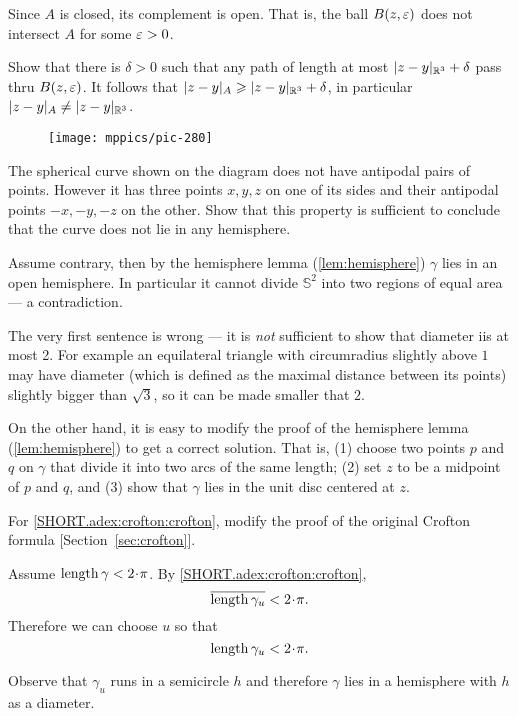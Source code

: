 Since $A$ is closed, its complement is open.
That is, the ball $B(z,\varepsilon)$ does not intersect $A$ for some $\varepsilon>0$.

Show that there is $\delta>0$ such that any path of length at most $|z-y|_{\mathbb{R}^3}+\delta$ pass thru $B(z,\varepsilon)$.
It follows that $|z-y|_A\geqslant |z-y|_{\mathbb{R}^3}+\delta$, 
in particular$|z-y|_A\ne |z-y|_{\mathbb{R}^3}$.

\begin{wrapfigure}{r}{30 mm}
\vskip-0mm
\centering
\texttt{[image: mppics/pic-280]}
\vskip0mm
\end{wrapfigure}

The spherical curve shown on the diagram does not have antipodal pairs of points.
However it has three points $x,y,z$ on one of its sides and their antipodal points $-x,-y,-z$ on the other.
Show that this property is sufficient to conclude that the curve does not lie in any hemisphere.

Assume contrary, then by the hemisphere lemma (\ref{lem:hemisphere}) $\gamma$ lies in an open hemisphere.
In particular it cannot divide $\mathbb{S}^2$ into two regions of equal area --- a contradiction.

The very first sentence is wrong --- it is {}\emph{not} sufficient to show that diameter iis at most 2.
For example an equilateral triangle with circumradius slightly above $1$ may have diameter (which is defined as the maximal distance between its points) slightly bigger than $\sqrt3$, so it can be made smaller that $2$.

On the other hand, it is easy to modify the proof of the hemisphere lemma (\ref{lem:hemisphere}) to get a correct solution.
That is, (1) choose two points $p$ and $q$ on $\gamma$ that divide it into two arcs of the same length;
(2) set $z$ to be a midpoint of $p$ and $q$,
and (3) show that $\gamma$ lies in the unit disc centered at $z$.


For \ref{SHORT.adex:crofton:crofton}, modify the proof of the original Crofton formula
[Section~\ref{sec:crofton}].

Assume $\length \gamma<2\cdot\pi$.
By \ref{SHORT.adex:crofton:crofton},
\[\overline{\length \gamma_u}<2\cdot\pi.\]
Therefore we can choose $u$ so that 
\[\length \gamma_u<2\cdot\pi.\]

Observe that $\gamma_u$ runs in a semicircle $h$ and therefore $\gamma$ lies in a hemisphere with $h$ as a diameter.


